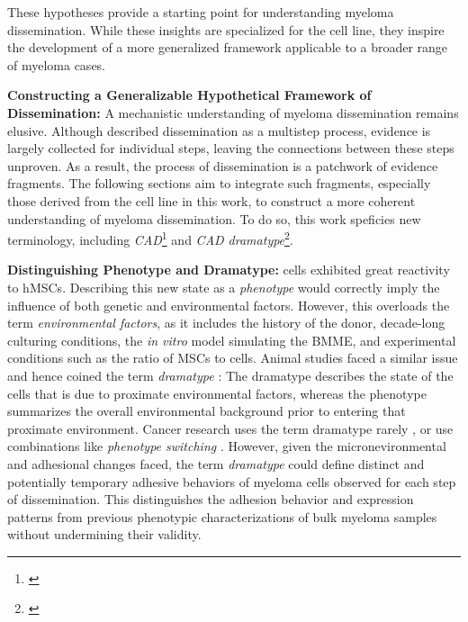 These hypotheses  provide a
starting point for understanding myeloma dissemination. While these insights are
specialized for the \INA cell line, they inspire the development of a more
generalized framework applicable to a broader range of myeloma cases.



\textbf{Constructing a Generalizable Hypothetical Framework of Dissemination:}
A mechanistic understanding of myeloma dissemination remains elusive. Although
\citet{zeissigTumourDisseminationMultiple2020} described dissemination as a
multistep process, evidence is largely collected for individual steps, leaving
the connections between these steps unproven. As a result, the process of
dissemination is a patchwork of evidence fragments. The following sections aim
to integrate such fragments, especially those derived from the \INA cell line in
this work, to construct a more coherent understanding of myeloma dissemination.
To do so, this work speficies new terminology, including
\emph{\acf{CAD}}\footnote{\footcad\label{foot:cad}}
and \emph{\ac{CAD} dramatype}\footnote{\footcaddt\label{foot:caddt}}.



\textbf{Distinguishing Phenotype and Dramatype:}
\INA cells exhibited great reactivity to \acp{hMSC}. Describing this new state
as a \emph{phenotype} would correctly imply the influence of both genetic and
environmental factors. However, this overloads the term \emph{environmental
      factors}, as it includes the history of the donor, decade-long culturing
conditions, the \textit{in vitro} model simulating the \ac{BMME}, and
experimental conditions such as the ratio of \acp{MSC} to \INA cells. Animal
studies faced a similar issue and hence coined the term
\emph{dramatype}
\cite{zutphenPrinciplesLaboratoryAnimal2001}: The dramatype describes the state
of the cells that is due to proximate environmental factors, whereas the
phenotype summarizes the overall environmental background prior to entering that
proximate environment. Cancer research uses the term dramatype rarely
\cite{hinoStudiesFamilialTumors2004}, or use combinations like \emph{phenotype
      switching} \cite{woutersRobustGeneExpression2020}. However, given the
micronevironmental and adhesional changes faced, the term \emph{dramatype} could
define distinct and potentially temporary adhesive behaviors of
myeloma cells observed for each step of dissemination. This distinguishes the
adhesion behavior and expression patterns from previous phenotypic
characterizations of bulk myeloma samples without undermining their validity.





